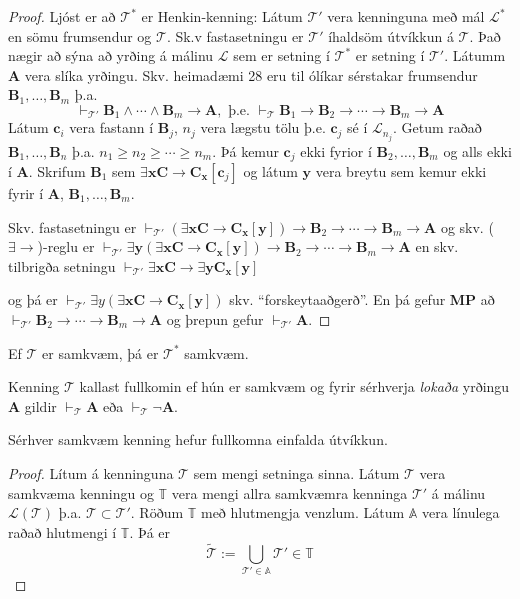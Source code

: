 \documentclass[12pt]{book}
\newcommand{\cT}{\mathcal{T}}
\newcommand{\cL}{\mathcal{L}}
\newcommand{\bA}{\mathbf{A}}
\newcommand{\bB}{\mathbf{B}}
\newcommand{\bC}{\mathbf{C}}
\newcommand{\bc}{\mathbf{c}}
\newcommand{\bx}{\mathbf{x}}
\newcommand{\by}{\mathbf{y}}
\newcommand{\vT}{\vdash_{\cT}}
\begin{document}
\begin{proof}
  Ljóst er að $\cT^*$ er Henkin-kenning: Látum $\cT'$ vera kenninguna með mál
$\cL^*$ en sömu frumsendur og $\cT$. Sk.v fastasetningu er $\cT'$ íhaldsöm útvíkkun
á $\cT$. Það nægir að sýna að yrðing á málinu $\cL$ sem er setning í $\cT^*$ er setning
í $\cT'$. Látumm $\bA$ vera slíka yrðingu. Skv. heimadæmi 28 eru til ólíkar sérstakar frumsendur
$\bB_1, \dots, \bB_m$ þ.a.
\[ \vdash_{\cT'} \bB_1 \wedge \dotsb \wedge \bB_m \to \bA, \text{ þ.e. } \vT \bB_1 \to \bB_2 \to \dotsb \to \bB_m \to \bA \]
Látum $\bc_i$ vera fastann í $\bB_j$, $n_j$ vera lægstu tölu þ.e. $\bc_j$ sé í $\cL_{n_j}$.
Getum raðað $\bB_1, \dots, \bB_n$ þ.a. $n_1 \geq n_2 \geq \dotsb \geq n_m$. Þá kemur $\bc_j$
ekki fyrior í $\bB_2, \dotsc, \bB_m$ og alls ekki í $\bA$. Skrifum $\bB_1$ sem $\exists \bx \bC \to \bC_{\bx}[\bc_j]$
og látum $\by$ vera breytu sem kemur ekki fyrir í $\bA$, $\bB_1, \dotsc, \bB_m$.

Skv. fastasetningu er $\vdash_{\cT'} (\exists \bx \bC \to \bC_{\bx}[\by]) \to \bB_2 \to \dotsb \to \bB_m \to \bA$
og skv. ($\exists \to$)-reglu er $\vdash_{\cT'} \exists \by ( \exists \bx \bC \to \bC_{\bx}[\by]) \to \bB_2 \to \dotsb \to \bB_m \to \bA$
en skv. tilbrigða setningu $\vdash_{\cT'} \exists \bx \bC \to \exists \by \bC_{\bx}[\by]$

og þá er $\vdash_{\cT'} \exists y ( \exists \bx \bC \to \bC_{\bx}[\by])$ skv. ``forskeytaaðgerð''.
En þá gefur \textbf{MP} að $\vdash_{\cT'} \bB_2 \to \dotsb \to \bB_m \to \bA$
og þrepun gefur $\vdash_{\cT'} \bA$.
\end{proof}

\begin{setn}[Fylgisetn]

Ef $\cT$ er samkvæm, þá er $\cT^*$ samkvæm.
  
\end{setn}

\begin{skgr}
  Kenning $\cT$ kallast fullkomin ef hún er samkvæm og fyrir sérhverja \emph{lokaða} yrðingu
$\bA$ gildir $\vT \bA$ eða $\vT \lnot \bA$.
\end{skgr}

\begin{setn}[Linenbaums]
 Sérhver samkvæm kenning hefur fullkomna einfalda útvíkkun. 
\end{setn}

\begin{proof}
  Lítum á kenninguna $\cT$ sem mengi setninga sinna. Látum $\cT$ vera samkvæma kenningu
  og $\mathbb{T}$ vera mengi allra samkvæmra kenninga $\cT'$ á málinu $\cL(\cT)$ þ.a.
  $\cT \subset \cT'$. Röðum $\mathbb{T}$ með hlutmengja venzlum. Látum $\mathbb{A}$
vera línulega raðað hlutmengi í $\mathbb{T}$. Þá er
\[ \widetilde{\cT} := \bigcup_{\cT' \in \mathbb{A}} \cT' \in \mathbb{T} \]
\end{proof}
\end{document}
